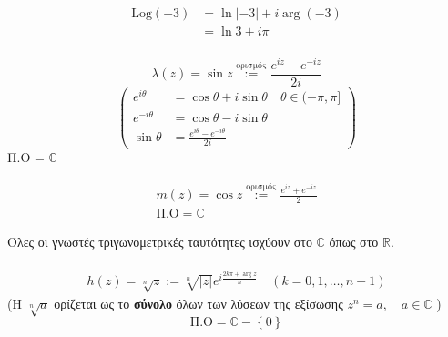 \documentclass[12pt,a4paper,notitlepage,fleqn]{article}
\begin{document}
   \begin{align*}
   \mathrm{Log}(-3) &= \ln|-3| + i\arg(-3) \\ &= \ln3+i\pi
   \end{align*}

    \paragraph{}
    \[
    \lambda(z) = \sin z \overset{\text{ορισμός}}{:=} \frac{e^{iz}-e^{-iz}}{2i}
    \]
    \[
    \left(
    \begin{array}{ll}
    e^{i\theta} &=\cos\theta+i\sin\theta  \quad \theta\in (-\pi,\pi] \\
    e^{-i\theta} &= \cos\theta -i\sin\theta \\[0.3pt] \hline
    \sin\theta &= \frac{e^{i\theta}-e^{-i\theta}}{2i}
    \end{array}
    \right)
    \]
    Π.Ο = \( \mathbb C \)

    \begin{gather*}
    m(z) = \cos z \overset{\text{ορισμός}}{:=} \frac{e^{iz}+e^{-iz}}{2} \\
    \text{Π.Ο} = \mathbb C
    \end{gather*}

    Όλες οι γνωστές τριγωνομετρικές ταυτότητες ισχύουν στο \( \mathbb C \)
    όπως στο \( \mathbb R  \).

    \paragraph{}
    \begin{align*}
    h(z) = \sqrt[n]{z} :=
    \sqrt[n]{|z|} e^{i\frac{2k\pi+\arg z}{n}} \quad (k=0,1,\dots,n-1)
    \end{align*}
    (Η \( \sqrt[n]{a} \) ορίζεται ως το \textbf{σύνολο} όλων των λύσεων
    της εξίσωσης \( z^n=a,\quad a\in\mathbb C \) )
    \[
    \text{Π.Ο} = \mathbb C - \left\lbrace 0 \right\rbrace
    \]
\end{document}
